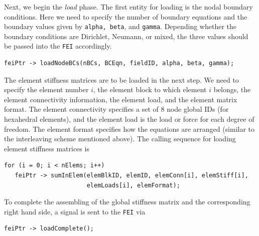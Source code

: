 Next, we begin the {\it load} phase. The first entity for loading is the
nodal boundary conditions. Here we need to specify the number of boundary
equations and the boundary values given by {\tt alpha, beta}, and {\tt gamma}.  Depending whether the boundary conditions are Dirichlet, Neumann, or mixed,
the three values should be passed into the {\tt FEI} accordingly. 
\begin{display}
\begin{verbatim}
feiPtr -> loadNodeBCs(nBCs, BCEqn, fieldID, alpha, beta, gamma);
\end{verbatim}
\end{display}
The element stiffness matrices are to be loaded in the next step. We need
to specify the element number $i$, the element block to which element $i$
belongs, the element connectivity information, the element load, and the
element matrix format. The element connectivity specifies a set of $8$ node
global IDs (for hexahedral elements), and the element load is the load or
force for each degree of freedom.  The element format specifies how the
equations are arranged (similar to the interleaving scheme mentioned above).
The calling sequence for loading element stiffness matrices is
\begin{display}
\begin{verbatim}
for (i = 0; i < nElems; i++)
   feiPtr -> sumInElem(elemBlkID, elemID, elemConn[i], elemStiff[i],
                       elemLoads[i], elemFormat);
\end{verbatim}
\end{display}
To complete the assembling of the global stiffness matrix and the
corresponding right hand side, a signal is sent to the {\tt FEI} via
\begin{display}
\begin{verbatim}
feiPtr -> loadComplete();
\end{verbatim}
\end{display}


